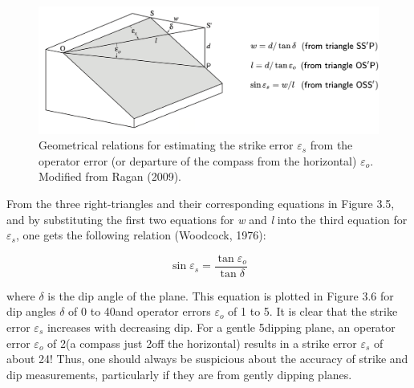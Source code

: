 \documentclass[a4paper , 12pt]{book}
\begin{document}
\begin{figure}[ht]
    \centering
    \includegraphics[width=13cm]{Figures/ch3f5.png}
    \caption{Geometrical relations for estimating the strike error $\varepsilon_s$ from the operator error (or departure of the compass from the horizontal) $\varepsilon_o$.  Modified from Ragan (2009).}
\end{figure}

From the three right-triangles and their corresponding equations in Figure 3.5, and by substituting the first two equations for \textit{w} and \textit{l} into the third equation for $\varepsilon_s$, one gets the following relation (Woodcock, 1976):

\begin{equation}
    \sin\varepsilon_s = \frac{\tan\varepsilon_o}{\tan\delta}
\end{equation}

where $\delta$ is the dip angle of the plane. This equation is plotted in Figure 3.6 for dip angles $\delta$ of 0 to 40\degree and operator errors $\varepsilon_o$ of 1 to 5\degree. It is clear that the strike error $\varepsilon_s$ increases with decreasing dip. For a gentle 5\degree dipping plane, an operator error $\varepsilon_o$ of 2\degree (a compass just 2\degree off the horizontal) results in a strike error $\varepsilon_s$ of about 24\degree! Thus, one should always be suspicious about the accuracy of strike and dip measurements, particularly if they are from gently dipping planes.
\end{document}
